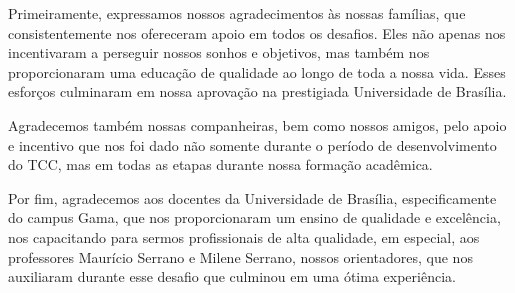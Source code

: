 \begin{agradecimentos}

Primeiramente, expressamos nossos agradecimentos às nossas famílias, que consistentemente nos ofereceram 
apoio em todos os desafios. Eles não apenas nos incentivaram a perseguir nossos sonhos e objetivos, mas 
também nos proporcionaram uma educação de qualidade ao longo de toda a nossa vida. Esses esforços culminaram 
em nossa aprovação na prestigiada Universidade de Brasília.

Agradecemos também nossas companheiras, bem como nossos amigos, pelo apoio e incentivo que nos foi dado não 
somente durante o período de desenvolvimento do TCC, mas em todas as etapas durante nossa formação acadêmica.

Por fim, agradecemos aos docentes da Universidade de Brasília, especificamente do campus Gama, que nos proporcionaram 
um ensino de qualidade e excelência, nos capacitando para sermos profissionais de alta qualidade, em especial, aos 
professores Maurício Serrano e Milene Serrano, nossos orientadores, que nos auxiliaram durante esse desafio 
que culminou em uma ótima experiência.

\end{agradecimentos}

